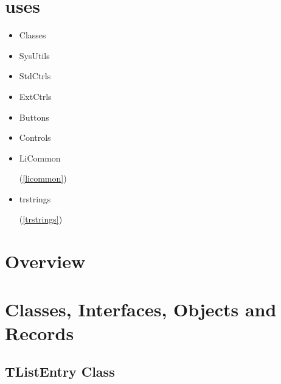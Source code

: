 \documentclass{report}
\newif\ifpdf
\begin{document}
\section{uses}
\begin{itemize}
\item \begin{ttfamily}Classes\end{ttfamily}\item \begin{ttfamily}SysUtils\end{ttfamily}\item \begin{ttfamily}StdCtrls\end{ttfamily}\item \begin{ttfamily}ExtCtrls\end{ttfamily}\item \begin{ttfamily}Buttons\end{ttfamily}\item \begin{ttfamily}Controls\end{ttfamily}\item \begin{ttfamily}LiCommon\end{ttfamily}(\ref{licommon})\item \begin{ttfamily}trstrings\end{ttfamily}(\ref{trstrings})\end{itemize}
\section{Overview}
\begin{description}
\item[\texttt{\begin{ttfamily}TListEntry\end{ttfamily} Class}]
\end{description}
\section{Classes, Interfaces, Objects and Records}
\ifpdf
\subsection*{\large{\textbf{TListEntry Class}}\normalsize\hspace{1ex}\hrulefill}
\else
\end{document}
